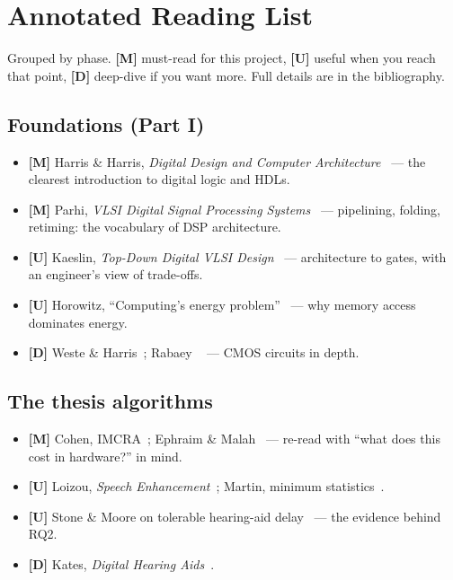 \chapter{Annotated Reading List}\label{app:reading}

Grouped by phase. \textbf{[M]} must-read for this project, \textbf{[U]} useful
when you reach that point, \textbf{[D]} deep-dive if you want more. Full
details are in the bibliography.

\section*{Foundations (Part I)}
\begin{itemize}
  \item \textbf{[M]} Harris \& Harris, \emph{Digital Design and Computer
        Architecture}~\cite{harris2021ddca} --- the clearest introduction to
        digital logic and HDLs.
  \item \textbf{[M]} Parhi, \emph{VLSI Digital Signal Processing
        Systems}~\cite{parhi1999vlsidsp} --- pipelining, folding, retiming:
        the vocabulary of DSP architecture.
  \item \textbf{[U]} Kaeslin, \emph{Top-Down Digital VLSI
        Design}~\cite{ch12-13:kaeslin2014topdown} --- architecture to gates,
        with an engineer's view of trade-offs.
  \item \textbf{[U]} Horowitz, \enquote{Computing's energy
        problem}~\cite{ch12-13:horowitz2014energy} --- why memory access
        dominates energy.
  \item \textbf{[D]} Weste \& Harris~\cite{weste2010cmos}; Rabaey
        \etal~\cite{rabaey2003digital} --- CMOS circuits in depth.
\end{itemize}

\section*{The thesis algorithms}
\begin{itemize}
  \item \textbf{[M]} Cohen, IMCRA~\cite{cohen2003imcra}; Ephraim \&
        Malah~\cite{ephraim1984mmse} --- re-read with \enquote{what does this cost
        in hardware?} in mind.
  \item \textbf{[U]} Loizou, \emph{Speech Enhancement}~\cite{loizou2013se};
        Martin, minimum statistics~\cite{martin2001minstat}.
  \item \textbf{[U]} Stone \& Moore on tolerable hearing-aid
        delay~\cite{stone1999delay,stone2008delay} --- the evidence behind RQ2.
  \item \textbf{[D]} Kates, \emph{Digital Hearing Aids}~\cite{kates2008hearingaids}.
\end{itemize}

